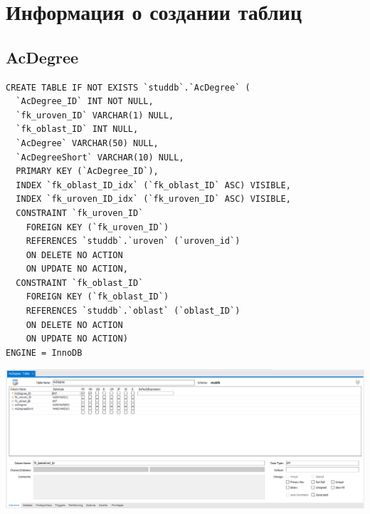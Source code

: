 \documentclass[a4paper, 12pt]{article}
\begin{document}
\section{Информация о создании таблиц}
\subsection{AcDegree}
\begin{lstlisting}
CREATE TABLE IF NOT EXISTS `studdb`.`AcDegree` (
  `AcDegree_ID` INT NOT NULL,
  `fk_uroven_ID` VARCHAR(1) NULL,
  `fk_oblast_ID` INT NULL,
  `AcDegree` VARCHAR(50) NULL,
  `AcDegreeShort` VARCHAR(10) NULL,
  PRIMARY KEY (`AcDegree_ID`),
  INDEX `fk_oblast_ID_idx` (`fk_oblast_ID` ASC) VISIBLE,
  INDEX `fk_uroven_ID_idx` (`fk_uroven_ID` ASC) VISIBLE,
  CONSTRAINT `fk_uroven_ID`
    FOREIGN KEY (`fk_uroven_ID`)
    REFERENCES `studdb`.`uroven` (`uroven_id`)
    ON DELETE NO ACTION
    ON UPDATE NO ACTION,
  CONSTRAINT `fk_oblast_ID`
    FOREIGN KEY (`fk_oblast_ID`)
    REFERENCES `studdb`.`oblast` (`oblast_ID`)
    ON DELETE NO ACTION
    ON UPDATE NO ACTION)
ENGINE = InnoDB  
\end{lstlisting}
\includegraphics[width=\textwidth]{2-1.png}
\end{document}
